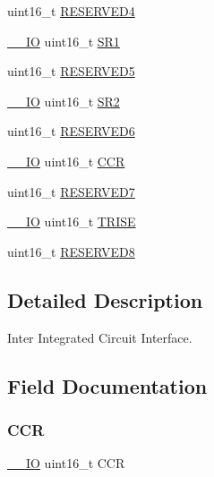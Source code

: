 \begin{DoxyCompactItemize}
\item 
uint16\+\_\+t \mbox{\hyperlink{struct_i2_c___type_def_aa0223808025f5bf9c056185038c9d545}{R\+E\+S\+E\+R\+V\+E\+D4}}
\item 
\mbox{\hyperlink{core__sc300_8h_aec43007d9998a0a0e01faede4133d6be}{\+\_\+\+\_\+\+IO}} uint16\+\_\+t \mbox{\hyperlink{struct_i2_c___type_def_a1e79a16729e8d1032d9fe552d50dce41}{S\+R1}}
\item 
uint16\+\_\+t \mbox{\hyperlink{struct_i2_c___type_def_abd36010ac282682d1f3c641b183b1b6f}{R\+E\+S\+E\+R\+V\+E\+D5}}
\item 
\mbox{\hyperlink{core__sc300_8h_aec43007d9998a0a0e01faede4133d6be}{\+\_\+\+\_\+\+IO}} uint16\+\_\+t \mbox{\hyperlink{struct_i2_c___type_def_a682809d3f8187cdefb9d615e89b67e65}{S\+R2}}
\item 
uint16\+\_\+t \mbox{\hyperlink{struct_i2_c___type_def_aab502dde158ab7da8e7823d1f8a06edb}{R\+E\+S\+E\+R\+V\+E\+D6}}
\item 
\mbox{\hyperlink{core__sc300_8h_aec43007d9998a0a0e01faede4133d6be}{\+\_\+\+\_\+\+IO}} uint16\+\_\+t \mbox{\hyperlink{struct_i2_c___type_def_a7ac198788f460fa6379bceecab79c5f7}{C\+CR}}
\item 
uint16\+\_\+t \mbox{\hyperlink{struct_i2_c___type_def_ab1820c97e368d349f5f4121f015d9fab}{R\+E\+S\+E\+R\+V\+E\+D7}}
\item 
\mbox{\hyperlink{core__sc300_8h_aec43007d9998a0a0e01faede4133d6be}{\+\_\+\+\_\+\+IO}} uint16\+\_\+t \mbox{\hyperlink{struct_i2_c___type_def_a7fbb70132ee565bb179078b6ee20cc2b}{T\+R\+I\+SE}}
\item 
uint16\+\_\+t \mbox{\hyperlink{struct_i2_c___type_def_afc22764fbf9ee7ce28174d65d0260f18}{R\+E\+S\+E\+R\+V\+E\+D8}}
\end{DoxyCompactItemize}


\subsection{Detailed Description}
Inter Integrated Circuit Interface. 

\subsection{Field Documentation}
\mbox{\label{struct_i2_c___type_def_a7ac198788f460fa6379bceecab79c5f7}} 
\subsubsection{\texorpdfstring{CCR}{CCR}}
{\footnotesize\ttfamily \mbox{\hyperlink{core__sc300_8h_aec43007d9998a0a0e01faede4133d6be}{\+\_\+\+\_\+\+IO}} uint16\+\_\+t C\+CR}

